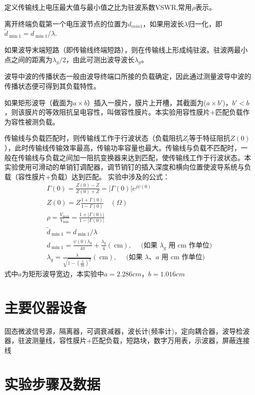 \documentclass{../source/zjureport}
\begin{document}
定义传输线上电压最大值与最小值之比为驻波系数VSWR,常用$\rho$表示。

离开终端负载第一个电压波节点的位置为$d_{min1}$，如果用波长$\lambda$归一化，即$\tilde{d}_{\min 1}=d_{\min 1} / \lambda$.

如果波导末端短路（即传输线终端短路），则在传输线上形成纯驻波。驻波两最小点之间的距离为$\lambda_g/2$，由此可测出波导波长$\lambda_g$。

波导中波的传播状态一般由波导终端口所接的负载确定，因此通过测量波导中波的传播状态便可得到其负载特性。

如果矩形波导（截面为$a\times b$）插入一膜片，膜片上开槽，其截面为($a\times b'$)，$b'< b$，则该膜片的等效阻抗呈电容性，叫做容性膜片。本实验用容性膜片+匹配负载作为容性被测负载。

传输线与负载匹配时，则传输线工作于行波状态（负载阻抗$Z_l$等于特征阻抗$Z(0)$），此时传输线传输效率最高，传输功率容量也最大。传输线与负载不匹配时，一般在传输线与负载之间加一阻抗变换器来达到匹配，使传输线工作于行波状态。本实验使用可滑动的单销钉调配器，调节销钉的插入深度和横向位置使波导系统与负载（容性膜片+负载）达到匹配。
实验中涉及的公式：
$$
\begin{aligned}
&\Gamma(0)=\frac{Z(0)-Z}{Z(0)+Z}=|\Gamma(0)| e^{j \psi(0)} \\
&Z(0)=Z \frac{1+\Gamma(0)}{1-\Gamma(0)} \quad(\Omega) \\
&\rho=\frac{V_{\max }}{V_{\min }}=\frac{1+|\Gamma(0)|}{1-|\Gamma(0)|} \\
&\tilde{d}_{\min 1}=d_{\min 1} / \lambda \\
&d_{\min 1}=\frac{\psi(0) \lambda_{g}}{4 \pi}+\frac{\lambda_{g}}{4}(\mathrm{~cm}), \quad \text { (如果 } \lambda_{g} \text { 用 } \mathrm{cm} \text { 作单位) } \\
&\lambda_{g}=\frac{\lambda}{\sqrt{1-\left(\frac{\lambda}{2 a}\right)^{2}}}(\mathrm{~cm}), \quad \text { (如果 } \lambda 、 a \text { 用 } \mathrm{cm} \text { 作单位) }
\end{aligned}
$$
式中$a$为矩形波导宽边，本实验中$a =2.286 cm，b=1.016cm$

    \section{主要仪器设备}
    固态微波信号源，隔离器，可调衰减器，波长计(频率计)，定向耦合器，波导检波器，驻波测量线，容性膜片+匹配负载，短路块，数字万用表，示波器，屏蔽连接线

    \section{实验步骤及数据}
\end{document}
